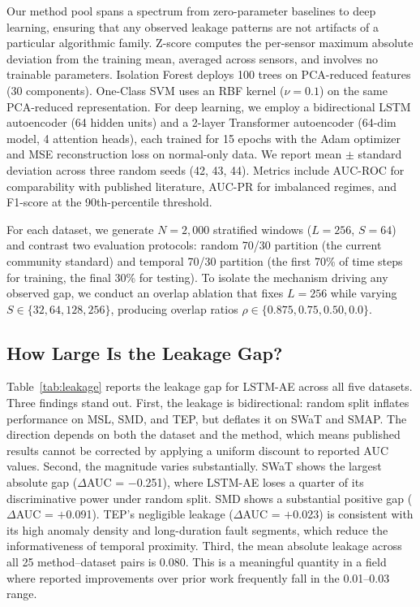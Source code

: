 \documentclass[preprint,12pt]{elsarticle}
\begin{document}
Our method pool spans a spectrum from zero-parameter baselines to deep learning, ensuring that any observed leakage patterns are not artifacts of a particular algorithmic family. Z-score computes the per-sensor maximum absolute deviation from the training mean, averaged across sensors, and involves no trainable parameters. Isolation Forest \cite{liu2008isolation} deploys 100 trees on PCA-reduced features (30 components). One-Class SVM \cite{scholkopf2001estimating} uses an RBF kernel ($\nu = 0.1$) on the same PCA-reduced representation. For deep learning, we employ a bidirectional LSTM autoencoder (64 hidden units) and a 2-layer Transformer autoencoder (64-dim model, 4 attention heads), each trained for 15 epochs with the Adam optimizer and MSE reconstruction loss on normal-only data. We report mean $\pm$ standard deviation across three random seeds (42, 43, 44). Metrics include AUC-ROC for comparability with published literature, AUC-PR for imbalanced regimes, and F1-score at the 90th-percentile threshold.

For each dataset, we generate $N = 2{,}000$ stratified windows ($L = 256$, $S = 64$) and contrast two evaluation protocols: random 70/30 partition (the current community standard) and temporal 70/30 partition (the first 70\% of time steps for training, the final 30\% for testing). To isolate the mechanism driving any observed gap, we conduct an overlap ablation that fixes $L = 256$ while varying $S \in \{32, 64, 128, 256\}$, producing overlap ratios $\rho \in \{0.875, 0.75, 0.50, 0.0\}$.

\subsection{How Large Is the Leakage Gap?}

Table~\ref{tab:leakage} reports the leakage gap for LSTM-AE across all five datasets. Three findings stand out. First, the leakage is bidirectional: random split inflates performance on MSL, SMD, and TEP, but deflates it on SWaT and SMAP. The direction depends on both the dataset and the method, which means published results cannot be corrected by applying a uniform discount to reported AUC values. Second, the magnitude varies substantially. SWaT shows the largest absolute gap ($\Delta$AUC = $-$0.251), where LSTM-AE loses a quarter of its discriminative power under random split. SMD shows a substantial positive gap ($\Delta$AUC = $+$0.091). TEP's negligible leakage ($\Delta$AUC = $+$0.023) is consistent with its high anomaly density and long-duration fault segments, which reduce the informativeness of temporal proximity. Third, the mean absolute leakage across all 25 method--dataset pairs is 0.080. This is a meaningful quantity in a field where reported improvements over prior work frequently fall in the 0.01--0.03 range.
\end{document}
